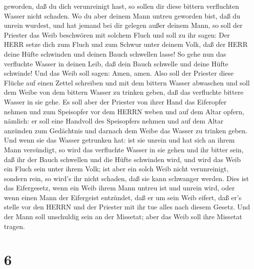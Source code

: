 geworden, daß du dich verunreinigt hast, so sollen dir diese bittern
verfluchten Wasser nicht schaden.  Wo du aber deinem Mann
untreu geworden bist, daß du unrein wurdest, und hat jemand bei dir
gelegen außer deinem Mann,  so soll der Priester das Weib
beschwören mit solchem Fluch und soll zu ihr sagen: Der HERR setze dich
zum Fluch und zum Schwur unter deinem Volk, daß der HERR deine Hüfte
schwinden und deinen Bauch schwellen lasse!  So gehe nun
das verfluchte Wasser in deinen Leib, daß dein Bauch schwelle und deine
Hüfte schwinde! Und das Weib soll sagen: Amen, amen.  Also
soll der Priester diese Flüche auf einen Zettel schreiben und mit dem
bittern Wasser abwaschen  und soll dem Weibe von dem
bittern Wasser zu trinken geben, daß das verfluchte bittere Wasser in
sie gehe.  Es soll aber der Priester von ihrer Hand das
Eiferopfer nehmen und zum Speisopfer vor dem HERRN weben und auf dem
Altar opfern, nämlich:  er soll eine Handvoll des
Speisopfers nehmen und auf dem Altar anzünden zum Gedächtnis und darnach
dem Weibe das Wasser zu trinken geben.  Und wenn sie das
Wasser getrunken hat: ist sie unrein und hat sich an ihrem Mann
versündigt, so wird das verfluchte Wasser in sie gehen und ihr bitter
sein, daß ihr der Bauch schwellen und die Hüfte schwinden wird, und wird
das Weib ein Fluch sein unter ihrem Volk;  ist aber ein
solch Weib nicht verunreinigt, sondern rein, so wird's ihr nicht
schaden, daß sie kann schwanger werden.  Dies ist das
Eifergesetz, wenn ein Weib ihrem Mann untreu ist und unrein wird,
 oder wenn einen Mann der Eifergeist entzündet, daß er um
sein Weib eifert, daß er's stelle vor den HERRN und der Priester mit ihr
tue alles nach diesem Gesetz.  Und der Mann soll unschuldig
sein an der Missetat; aber das Weib soll ihre Missetat tragen.

\hypertarget{section-5}{%
\section{6}\label{section-5}}

